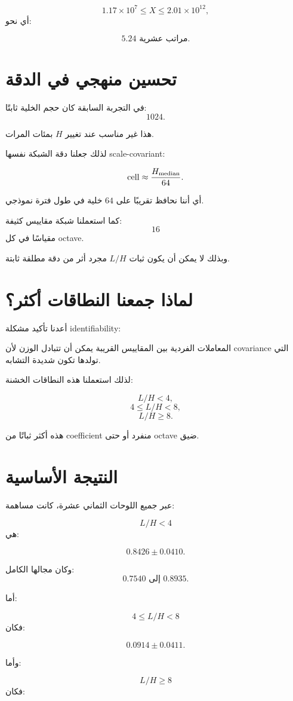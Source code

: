 \documentclass[12pt]{article}
\begin{document}
\[
1.17\times10^7
\le X\le
2.01\times10^{12},
\]
أي نحو:

\[
\boxed{5.24\text{ مراتب عشرية}.}
\]

\section{تحسين منهجي في الدقة}

في التجربة السابقة كان حجم الخلية ثابتًا:
\[
1024.
\]

هذا غير مناسب عند تغيير \(H\) بمئات المرات.

لذلك جعلنا دقة الشبكة نفسها scale-covariant:

\[
\mathrm{cell}
\approx
\frac{H_{\rm median}}{64}.
\]

أي أننا نحافظ تقريبًا على \(64\) خلية في طول فترة نموذجي.

كما استعملنا شبكة مقاييس كثيفة:
\[
16
\]
مقياسًا في كل octave.

وبذلك لا يمكن أن يكون ثبات \(L/H\) مجرد أثر من دقة مطلقة ثابتة.

\section{لماذا جمعنا النطاقات أكثر؟}

أعدنا تأكيد مشكلة identifiability:

المعاملات الفردية بين المقاييس القريبة يمكن أن تتبادل الوزن لأن covariance
التي تولدها تكون شديدة التشابه.

لذلك استعملنا هذه النطاقات الخشنة:

\[
L/H<4,
\]
\[
4\le L/H<8,
\]
\[
L/H\ge8.
\]

هذه أكثر ثباتًا من coefficient منفرد أو حتى octave ضيق.

\section{النتيجة الأساسية}

عبر جميع اللوحات الثماني عشرة، كانت مساهمة:

\[
L/H<4
\]
هي:

\[
\boxed{
0.8426\pm0.0410.
}
\]

وكان مجالها الكامل:
\[
0.7540
\text{ إلى }
0.8935.
\]

أما:

\[
4\le L/H<8
\]
فكان:

\[
0.0914\pm0.0411.
\]

وأما:

\[
L/H\ge8
\]
فكان:
\end{document}
